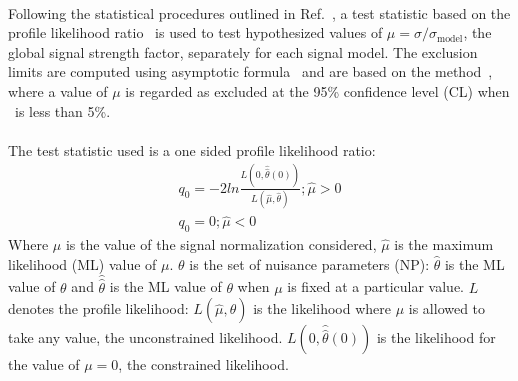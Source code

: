 
\paragraph{}
Following the statistical procedures outlined in Ref.~\cite{Aad:2012tfa}, a test statistic based on the profile likelihood ratio~\cite{Cowan:2010js} is used to test hypothesized values of $\mu=\sigma/\sigma_{\mathrm{model}}$, the global signal strength factor, separately for each signal model. 
The exclusion limits are computed using asymptotic formula~\cite{Cowan:2010js} and are based on the \cls method~\cite{Read:2002hq}, where a value of $\mu$ is regarded as excluded at the 95\% confidence level (CL) when \cls~is less than 5\%.

\paragraph{}
The test statistic used is a one sided profile likelihood ratio:
\begin{eqnarray}
  {q_{0}} = -2 ln \frac{L(0,\hat{\hat{\theta}}(0))}{L(\hat{\mu},\hat{\theta})}; \hat{\mu} > 0 \\
  {q_{0}} =  0 ; \hat{\mu} < 0 
\end{eqnarray}
Where $\mu$ is the value of the signal normalization considered, $\hat{\mu}$ is the maximum likelihood (ML) value of $\mu$. 
$\theta$ is the set of nuisance parameters (NP): $\hat{\theta}$ is the ML value of $\theta$ and 
$\hat{\hat{\theta}}$ is the ML value of $\theta$ when $\mu$ is fixed at a particular value. 
$L$ denotes the profile likelihood: $L(\hat{\mu},\hat{\theta})$ is the likelihood where $\mu$ is allowed to take any value, the unconstrained likelihood. 
$L(0,\hat{\hat{\theta}}(0))$ is the likelihood for the value of $\mu = 0$, the constrained likelihood.

